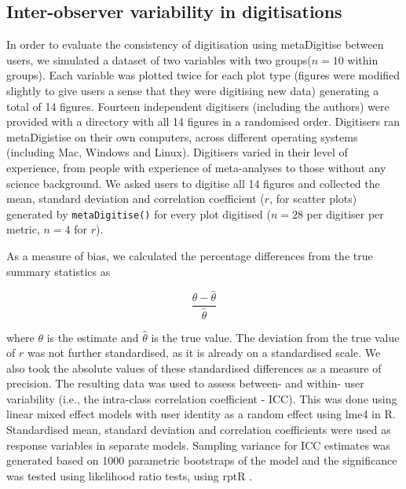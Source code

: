 \documentclass[12pt]{article}
\newcommand{\fct}[1]{\texttt{#1()}}
\newcommand{\pkg}[1]{{\fontseries{b}\selectfont #1}}
\let\proglang=\textsf
\begin{document}
\subsection{Inter-observer variability in digitisations}
In order to evaluate the consistency of digitisation using \pkg{metaDigitise} between users, we simulated a dataset of two variables with two groups($n=10$ within groups). Each variable was plotted twice for each plot type (figures were modified slightly to give users a sense that they were digitising new data) generating a total of 14 figures. Fourteen independent digitisers (including the authors) were provided with a directory with all 14 figures in a randomised order. Digitisers ran \pkg{metaDigistise} on their own computers, across different operating systems (including Mac, Windows and Linux). Digitisers varied in their level of experience, from people with experience of meta-analyses to those without any science background. We asked users to digitise all 14 figures and collected the mean, standard deviation and correlation coefficient ($r$, for scatter plots) generated by \fct{metaDigitise} for every plot digitised ($n=28$ per digitiser per metric, $n=4$ for $r$). 

As a measure of bias, we calculated the percentage differences from the true summary statistics as

\begin{equation}
\frac{\theta - \hat{\theta}}{\hat{\theta}}
\end{equation}

where $\theta$ is the estimate and $\hat{\theta}$ is the true value. The deviation from the true value of $r$ was not further standardised, as it is already on a standardised scale. We also took the absolute values of these standardised differences as a measure of precision. The resulting data was used to assess between- and within- user variability (i.e., the intra-class correlation coefficient - ICC). This was done using linear mixed effect models with user identity as a random effect using \pkg{lme4} \citep{bates2015} in \proglang{R}. Standardised mean, standard deviation and correlation coefficients were used as response variables in separate models. Sampling variance for ICC estimates was generated based on 1000 parametric bootstraps of the model and the significance was tested using likelihood ratio tests, using \pkg{rptR} \citep{stoffel2017}.  
\end{document}
